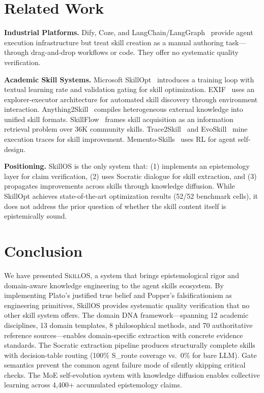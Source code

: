 \documentclass[11pt]{article}
\begin{document}
\section{Related Work}

\textbf{Industrial Platforms.} Dify, Coze, and LangChain/LangGraph~\cite{langchain} provide agent execution infrastructure but treat skill creation as a manual authoring task---through drag-and-drop workflows or code. They offer no systematic quality verification.

\textbf{Academic Skill Systems.} Microsoft SkillOpt~\cite{skillopt} introduces a training loop with textual learning rate and validation gating for skill optimization. EXIF~\cite{exif} uses an explorer-executor architecture for automated skill discovery through environment interaction. Anything2Skill~\cite{anything2skill} compiles heterogeneous external knowledge into unified skill formats. SkillFlow~\cite{skillflow} frames skill acquisition as an information retrieval problem over 36K community skills. Trace2Skill~\cite{trace2skill} and EvoSkill~\cite{evoskill} mine execution traces for skill improvement. Memento-Skills~\cite{mementoskills} uses RL for agent self-design.

\textbf{Positioning.} SkillOS is the only system that: (1) implements an epistemology layer for claim verification, (2) uses Socratic dialogue for skill extraction, and (3) propagates improvements across skills through knowledge diffusion. While SkillOpt achieves state-of-the-art optimization results (52/52 benchmark cells), it does not address the prior question of whether the skill content itself is epistemically sound.

\section{Conclusion}

We have presented \textsc{SkillOS}, a system that brings epistemological rigor and domain-aware knowledge engineering to the agent skills ecosystem. By implementing Plato's justified true belief and Popper's falsificationism as engineering primitives, SkillOS provides systematic quality verification that no other skill system offers. The domain DNA framework---spanning 12 academic disciplines, 13 domain templates, 8 philosophical methods, and 70 authoritative reference sources---enables domain-specific extraction with concrete evidence standards. The Socratic extraction pipeline produces structurally complete skills with decision-table routing (100\% S\_route coverage vs.\ 0\% for bare LLM). Gate semantics prevent the common agent failure mode of silently skipping critical checks. The MoE self-evolution system with knowledge diffusion enables collective learning across 4,400+ accumulated epistemology claims.
\end{document}
